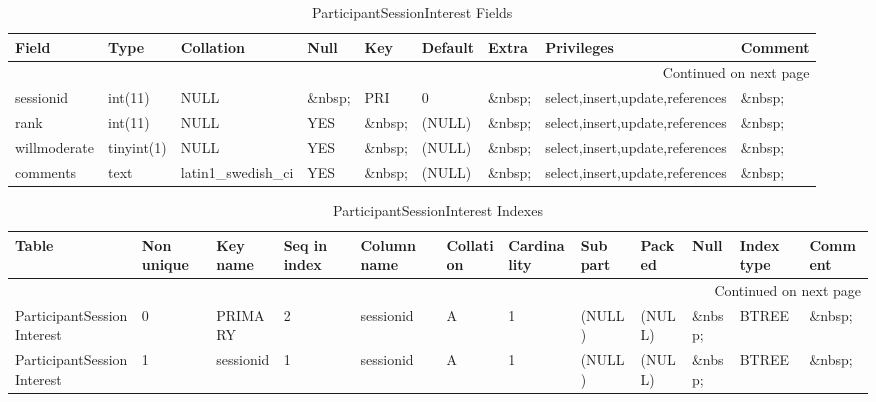 \documentclass[tablesignature,landscape]{scrartcl}
\begin{document}
\begin{longtable}{|l|l|l|l|l|l|l|l|l|}
\caption{ParticipantSessionInterest Fields} \label{tbl:participantsessioninterestfields}\\
\hline
 Field         &  Type         &  Collation                &  Null     &  Key      &  Default  &  Extra    &  Privileges                       &  Comment \\
\hline
\endhead
\hline\multicolumn{9}{r}{Continued on next page}\
\endfoot
\endlastfoot
\hline
 badgeid       &  varchar(15)  &  latin1\_{}swedish\_{}ci  &  \&nbsp;  &  PRI      &  \&nbsp;  &  \&nbsp;  &  select,insert,update,references  &  \&nbsp;  \\
 sessionid     &  int(11)      &  NULL                     &  \&nbsp;  &  PRI      &  0        &  \&nbsp;  &  select,insert,update,references  &  \&nbsp;  \\
 rank          &  int(11)      &  NULL                     &  YES      &  \&nbsp;  &  (NULL)   &  \&nbsp;  &  select,insert,update,references  &  \&nbsp;  \\
 willmoderate  &  tinyint(1)   &  NULL                     &  YES      &  \&nbsp;  &  (NULL)   &  \&nbsp;  &  select,insert,update,references  &  \&nbsp;  \\
 comments      &  text         &  latin1\_{}swedish\_{}ci  &  YES      &  \&nbsp;  &  (NULL)   &  \&nbsp;  &  select,insert,update,references  &  \&nbsp;  \\
\hline
\end{longtable}


\begin{longtable}{|l|l|l|l|l|l|l|l|l|l|l|l|}
\caption{ParticipantSessionInterest Indexes} \label{tbl:participantsessioninterestindexes}\\
\hline
 Table                       &  Non unique  &  Key name   &  Seq in index  &  Column name  &  Collation  &  Cardinality  &  Sub part  &  Packed  &  Null     &  Index type  &  Comment \\
\hline
\endhead
\hline\multicolumn{12}{r}{Continued on next page}\
\endfoot
\endlastfoot
\hline
 ParticipantSessionInterest  &           0  &  PRIMARY    &             1  &  badgeid      &  A          &            1  &  (NULL)    &  (NULL)  &  \&nbsp;  &  BTREE       &  \&nbsp;  \\
 ParticipantSessionInterest  &           0  &  PRIMARY    &             2  &  sessionid    &  A          &            1  &  (NULL)    &  (NULL)  &  \&nbsp;  &  BTREE       &  \&nbsp;  \\
 ParticipantSessionInterest  &           1  &  sessionid  &             1  &  sessionid    &  A          &            1  &  (NULL)    &  (NULL)  &  \&nbsp;  &  BTREE       &  \&nbsp;  \\
\hline
\end{longtable}
\end{document}
